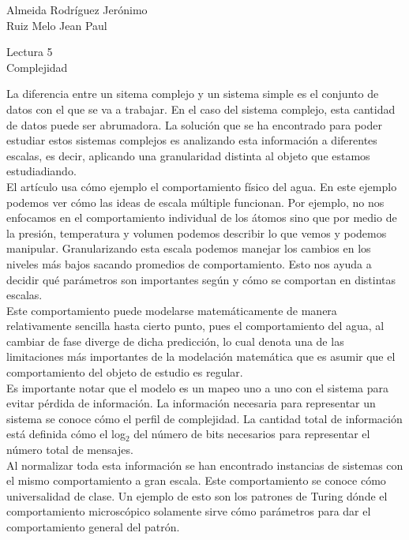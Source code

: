 \documentclass[a4paper, 12pt]{report}
\begin{document}
\begin{flushright}
    Almeida Rodríguez Jerónimo\\
    Ruiz Melo Jean Paul
\end{flushright}

\begin{center}
    {\LARGE Lectura 5}\\
    {\LARGE Complejidad}
\end{center}

La diferencia entre un sitema complejo y un sistema simple es el conjunto de
datos con el que se va a trabajar. En el caso del sistema complejo, esta
cantidad de datos puede ser abrumadora. La solución que se ha encontrado para
poder estudiar estos sistemas complejos es analizando esta información a
diferentes escalas, es decir, aplicando una granularidad distinta al objeto que
estamos estudiadiando.\\

El artículo usa cómo ejemplo el comportamiento físico del agua. En este ejemplo
podemos ver cómo las ideas de escala múltiple funcionan. Por ejemplo, no nos
enfocamos en el comportamiento individual de los átomos sino que por medio de la
presión, temperatura y volumen podemos describir lo que vemos y podemos
manipular. Granularizando esta escala podemos manejar los cambios en los niveles
más bajos sacando promedios de comportamiento. Esto nos ayuda a decidir qué
parámetros son importantes según y cómo se comportan en distintas escalas.\\

Este comportamiento puede modelarse matemáticamente de manera relativamente
sencilla hasta cierto punto, pues el comportamiento del agua, al cambiar de fase
diverge de dicha predicción, lo cual denota una de las limitaciones más
importantes de la modelación matemática que es asumir que el comportamiento del
objeto de estudio es regular.\\

Es importante notar que el modelo es un mapeo uno a uno con el sistema
para evitar pérdida de información. La información necesaria para representar un
sistema se conoce cómo el perfil de complejidad. La cantidad total de
información está definida cómo el log$_2$ del número de bits necesarios para
representar el número total de mensajes.\\

Al normalizar toda esta información se han encontrado instancias de sistemas con
el mismo comportamiento a gran escala. Este comportamiento se conoce cómo
universalidad de clase. Un ejemplo de esto son los patrones de Turing dónde el
comportamiento microscópico solamente sirve cómo parámetros para dar el
comportamiento general del patrón.
\end{document}

